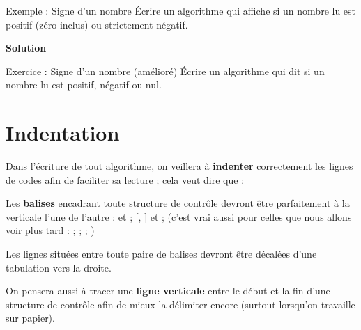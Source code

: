 \begin{Emphase}[exercice]{Exemple : Signe d'un nombre}
Écrire un algorithme qui affiche si un nombre lu est positif (zéro inclus)
ou strictement négatif.

{\bfseries Solution}

\end{Emphase}


\begin{Emphase}[exercice]{Exercice : Signe d'un nombre (amélioré)}
Écrire un algorithme qui dit si un nombre lu est positif, négatif ou
nul.
\end{Emphase}

\section{Indentation}

Dans l’écriture de tout algorithme, on veillera à \textbf{indenter}
correctement les lignes de codes afin de faciliter sa lecture ; cela
veut dire que :

\begin{liste}
\item {
Les \textbf{balises} encadrant toute structure de contrôle devront être
parfaitement à la verticale l’une de l’autre : 
et  ; 
[, ] et 
; (c'est vrai aussi pour celles que nous allons voir plus tard
:  ; 
; 
 
; )}
\item {
Les lignes situées entre toute paire de balises devront être décalées
d'une tabulation vers la droite.}
\item {
On pensera aussi à tracer une \textbf{ligne verticale} entre le début et la
fin d'une structure de contrôle afin de mieux la
délimiter encore (surtout lorsqu'on travaille sur papier). }
\end{liste}

